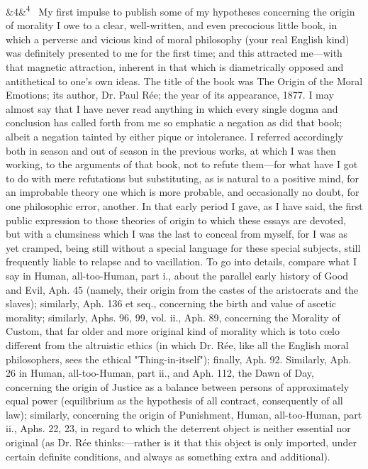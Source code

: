 \documentclass[12pt]{article}
\newcommand{\para}[1][]{\par\noindent\ifx&#1&\else\textsuperscript{\footnotesize #1}~\fi}
\begin{document}
\para[4] My first impulse to publish some of my hypotheses concerning the origin of morality I owe to a clear, well-written, and even precocious little book, in which a perverse and vicious kind of moral philosophy (your real English kind) was definitely presented to me for the first time; and this attracted me---with that magnetic attraction, inherent in that which is diametrically opposed and antithetical to one's own ideas. The title of the book was The Origin of the Moral Emotions; its author, Dr. Paul Rée; the year of its appearance, 1877. I may almost say that I have never read anything in which every single dogma and conclusion has called forth from me so emphatic a negation as did that book; albeit a negation tainted by either pique or intolerance. I referred accordingly both in season and out of season in the previous works, at which I was then working, to the arguments of that book, not to refute them---for what have I got to do with mere refutations but substituting, as is natural to a positive mind, for an improbable theory one which is more probable, and occasionally no doubt, for one philosophic error, another. In that early period I gave, as I have said, the first public expression to those theories of origin to which these essays are devoted, but with a clumsiness which I was the last to conceal from myself, for I was as yet cramped, being still without a special language for these special subjects, still frequently liable to relapse and to vacillation. To go into details, compare what I say in Human, all-too-Human, part i., about the parallel early history of Good and Evil, Aph. 45 (namely, their origin from the castes of the aristocrats and the slaves); similarly, Aph. 136 et seq., concerning the birth and value of ascetic morality; similarly, Aphs. 96, 99, vol. ii., Aph. 89, concerning the Morality of Custom, that far older and more original kind of morality which is toto cœlo different from the altruistic ethics (in which Dr. Rée, like all the English moral philosophers, sees the ethical "Thing-in-itself"); finally, Aph. 92. Similarly, Aph. 26 in Human, all-too-Human, part ii., and Aph. 112, the Dawn of Day, concerning the origin of Justice as a balance between persons of approximately equal power (equilibrium as the hypothesis of all contract, consequently of all law); similarly, concerning the origin of Punishment, Human, all-too-Human, part ii., Aphs. 22, 23, in regard to which the deterrent object is neither essential nor original (as Dr. Rée thinks:---rather is it that this object is only imported, under certain definite conditions, and always as something extra and additional).
\end{document}
